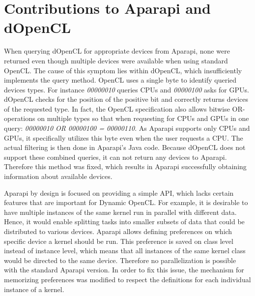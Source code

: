 \section*{Contributions to Aparapi and dOpenCL}
\begin{description}[style=nextline]
	\item [No available devices]
	When querying dOpenCL for appropriate devices from Aparapi, none were returned even though multiple devices were available when using standard OpenCL. The cause of this symptom lies within dOpenCL, which insufficiently implements the query method. OpenCL uses a single byte to identify queried devices types. For instance \textit{00000010} queries CPUs and \textit{00000100} asks for GPUs. dOpenCL checks for the position of the positive bit and correctly returns devices of the requested type. In fact, the OpenCL specification also allows bitwise OR-operations on multiple types so that when requesting for CPUs and GPUs in one query: \textit{00000010 OR 00000100 = 00000110}. As Aparapi supports only CPUs and GPUs, it specifically utilizes this byte even when the user requests a CPU. The actual filtering is then done in Aparapi's Java code. Because dOpenCL does not support these combined queries, it can not return any devices to Aparapi. Therefore this method was fixed, which results in Aparapi successfully obtaining information about available devices.

	\item [Insufficient device choice mechanism]
	Aparapi by design is focused on providing a simple API, which lacks certain features that are important for Dynamic OpenCL. For example, it is desirable to have multiple instances of the same kernel run in parallel with different data. Hence, it would enable splitting tasks into smaller subsets of data that could be distributed to various devices. Aparapi allows defining preferences on which specific device a kernel should be run. This preference is saved on class level instead of instance level, which means that all instances of the same kernel class would be directed to the same device. Therefore no parallelization is possible with the standard Aparapi version. In order to fix this issue, the mechanism for memorizing preferences was modified to respect the definitions for each individual instance of a kernel.


\end{description}
